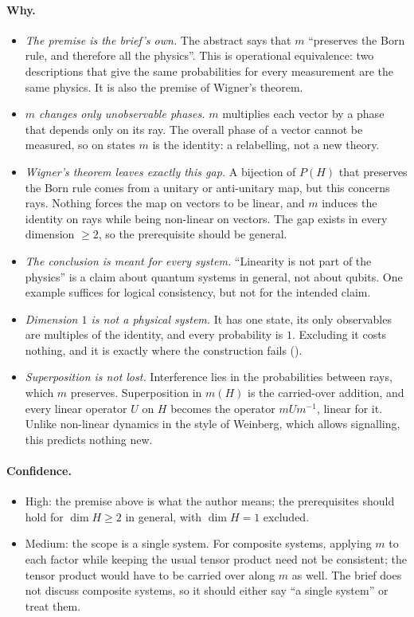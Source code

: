 \documentclass[11pt]{article}
\begin{document}
\paragraph{Why.}
\begin{itemize}
\item \emph{The premise is the brief's own.} The abstract says that $m$ ``preserves the Born
  rule, and therefore all the physics''. This is operational equivalence: two descriptions
  that give the same probabilities for every measurement are the same physics. It is also the
  premise of Wigner's theorem.
\item \emph{$m$ changes only unobservable phases.} $m$ multiplies each vector by a phase that
  depends only on its ray. The overall phase of a vector cannot be measured, so on states $m$
  is the identity: a relabelling, not a new theory.
\item \emph{Wigner's theorem leaves exactly this gap.} A bijection of $P(H)$ that preserves the
  Born rule comes from a unitary or anti-unitary map, but this concerns rays. Nothing forces the
  map on vectors to be linear, and $m$ induces the identity on rays while being non-linear on
  vectors. The gap exists in every dimension $\ge 2$, so the prerequisite should be general.
\item \emph{The conclusion is meant for every system.} ``Linearity is not part of the
  physics'' is a claim about quantum systems in general, not about qubits. One example
  suffices for logical consistency, but not for the intended claim.
\item \emph{Dimension $1$ is not a physical system.} It has one state, its only observables are
  multiples of the identity, and every probability is $1$. Excluding it costs nothing, and it
  is exactly where the construction fails ().
\item \emph{Superposition is not lost.} Interference lies in the probabilities between rays,
  which $m$ preserves. Superposition in $m(H)$ is the carried-over addition, and every
  linear operator $U$ on $H$ becomes the operator $mUm^{-1}$, linear for it. Unlike non-linear
  dynamics in the style of Weinberg, which allows signalling, this predicts nothing new.
\end{itemize}

\paragraph{Confidence.}
\begin{itemize}
\item High: the premise above is what the author means; the prerequisites should hold for
  $\dim H \ge 2$ in general, with $\dim H = 1$ excluded.
\item Medium: the scope is a single system. For composite systems, applying $m$ to each
  factor while keeping the usual tensor product need not be consistent; the tensor product
  would have to be carried over along $m$ as well. The brief does not discuss composite
  systems, so it should either say ``a single system'' or treat them.
\end{itemize}
\end{document}
